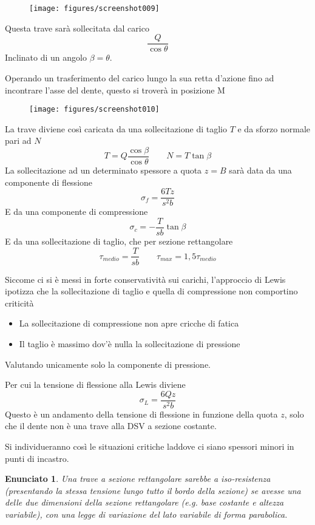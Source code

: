 \documentclass[a4paper, 15pt]{article}
\newtheorem*{en}{Enunciato}
\begin{document}
\begin{adjustwidth}{2in}{}
\begin{figure}[H]
	\centering
	\texttt{[image: figures/screenshot009]}
	\label{fig:screenshot009}
\end{figure}
\newpage
Questa trave sarà sollecitata dal carico 
\[\dfrac{Q}{\cos\theta}\]
Inclinato di un angolo $\beta=\theta$.

Operando un trasferimento del carico lungo la sua retta d'azione fino ad incontrare l'asse del dente, questo si troverà in posizione M
\begin{figure}[H]
	\centering
	\texttt{[image: figures/screenshot010]}
	\label{fig:screenshot010}
\end{figure}
La trave diviene così caricata da una sollecitazione di taglio $T$ e da sforzo normale pari ad $N$
\[T = Q\dfrac{\cos\beta}{\cos\theta} \qquad N = T\tan\beta\]
La sollecitazione ad un determinato spessore a quota $z=B$ sarà data da una componente di flessione 
\[\sigma_f = \dfrac{6Tz}{s^2b}\]
E da una componente di compressione 
\[\sigma_c = -\dfrac{T}{sb}\tan\beta\]
E da una sollecitazione di taglio, che per sezione rettangolare 
\[\tau_{medio} = \dfrac{T}{sb} \qquad \tau_{max} = 1,5\tau_{medio}\]

Siccome ci si è messi in forte conservatività sui carichi, l'approccio di Lewis ipotizza che la sollecitazione di taglio e quella di compressione non comportino criticità 
\begin{itemize}
	\item La sollecitazione di compressione non apre cricche di fatica
	\item Il taglio è massimo dov'è nulla la sollecitazione di pressione
\end{itemize}
Valutando unicamente solo la componente di pressione. \newline 

Per cui la tensione di flessione alla Lewis diviene 
\[\sigma_L = \dfrac{6Qz}{s^2b}\]
Questo è un andamento della tensione di flessione in funzione della quota $z$, solo che il dente non è una trave alla DSV a sezione costante. \newline 

Si individueranno così le situazioni critiche laddove ci siano spessori minori in punti di incastro. 

\begin{en}
	Una trave a sezione rettangolare sarebbe a iso-resistenza (presentando la stessa tensione lungo tutto il bordo della sezione) se avesse una delle due dimensioni della sezione rettangolare (e.g. base costante e altezza variabile), con una legge di variazione del lato variabile di forma parabolica. 
\end{en}


\end{adjustwidth}
\end{document}
